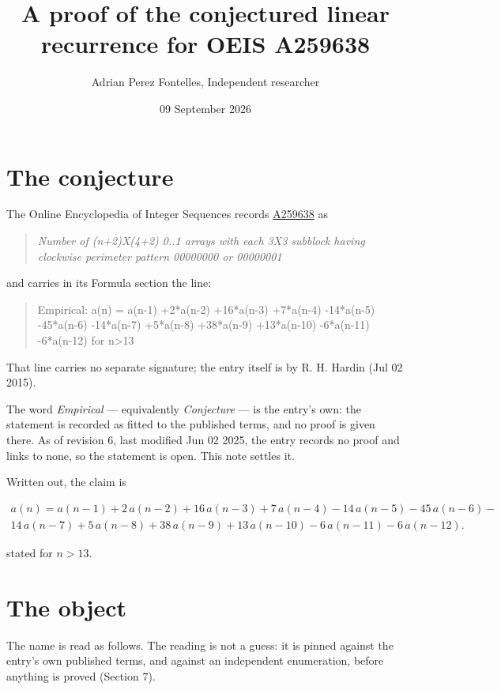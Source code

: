 \documentclass[11pt]{article}
\title{A proof of the conjectured linear recurrence for OEIS A259638}
\author{Adrian Perez Fontelles, Independent researcher}
\date{09 September 2026}
\theoremstyle{definition}
\begin{document}
\maketitle
\section{The conjecture}

The Online Encyclopedia of Integer Sequences records \href{https://oeis.org/A259638}{A259638} as

\begin{quote}\itshape Number of (n+2)X(4+2) 0..1 arrays with each 3X3 subblock having clockwise perimeter pattern 00000000 or 00000001\end{quote}

and carries in its Formula section the line:

\begin{quote}\ttfamily Empirical: a(n) = a(n-1) +2*a(n-2) +16*a(n-3) +7*a(n-4) -14*a(n-5) -45*a(n-6) -14*a(n-7) +5*a(n-8) +38*a(n-9) +13*a(n-10) -6*a(n-11) -6*a(n-12) for n>13\end{quote}

That line carries no separate signature; the entry itself is by R. H. Hardin (Jul 02 2015).

The word {\itshape Empirical} --- equivalently {\itshape Conjecture} --- is the entry's own: the statement is recorded as fitted to the published terms, and no proof is given there. As of revision 6, last modified Jun 02 2025, the entry records no proof and links to none, so the statement is open. This note settles it.

Written out, the claim is

\begin{multline*} a(n) = a(n-1) + 2\,a(n-2) + 16\,a(n-3) + 7\,a(n-4) - 14\,a(n-5) - 45\,a(n-6) - \\ 14\,a(n-7) + 5\,a(n-8) + 38\,a(n-9) + 13\,a(n-10) - 6\,a(n-11) - 6\,a(n-12). \end{multline*}

stated for $n > 13$.

\section{The object}

The name is read as follows. The reading is not a guess: it is pinned against the entry's own published terms, and against an independent enumeration, before anything is proved (Section 7).
\end{document}
